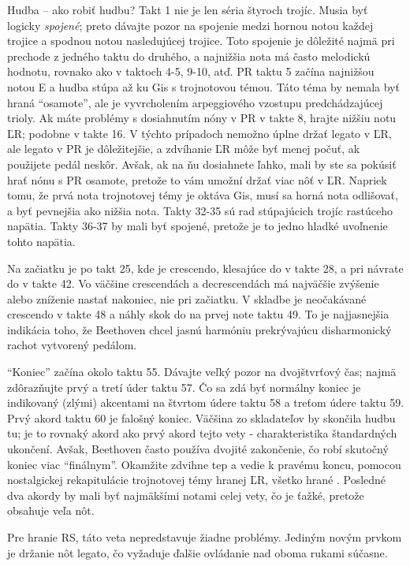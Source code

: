 Hudba – ako robiť hudbu? Takt 1 nie je len séria štyroch trojíc. Musia byť logicky \textit{spojené}; preto dávajte pozor na spojenie medzi hornou notou každej trojice a spodnou notou nasledujúcej trojice. Toto spojenie je dôležité najmä pri prechode z jedného taktu do druhého, a najnižšia nota má často melodickú hodnotu, rovnako ako v taktoch 4-5, 9-10, atď. PR taktu 5 začína najnižšou notou E a hudba stúpa až ku Gis s trojnotovou témou. Táto téma by nemala byť hraná “osamote”, ale je vyvrcholením arpeggiového vzostupu predchádzajúcej trioly. Ak máte problémy s dosiahnutím nóny v PR v takte 8, hrajte nižšiu notu ĽR; podobne v takte 16. V týchto prípadoch nemožno úplne držať legato v ĽR, ale legato v PR je dôležitejšie, a zdvíhanie ĽR môže byť menej počuť, ak použijete pedál neskôr. Avšak, ak na ňu dosiahnete ľahko, mali by ste sa pokúsiť hrať nónu s PR osamote, pretože to vám umožní držať viac nôť v ĽR. Napriek tomu, že prvá nota trojnotovej témy je oktáva Gis, musí sa horná nota odlišovať, a byť pevnejšia ako nižšia nota. Takty 32-35 sú rad stúpajúcich trojíc rastúceho napätia. Takty 36-37 by mali byť spojené, pretože je to jedno hladké uvoľnenie tohto napätia.

Na začiatku je  po takt 25, kde je crescendo, klesajúce do  v takte 28, a pri návrate do  v takte 42. Vo väčšine crescendách a decrescendách má najväčšie zvýšenie alebo zníženie nastať nakoniec, nie pri začiatku. V skladbe je neočakávané crescendo v takte 48 a náhly skok do  na prvej note taktu 49. To je najjasnejšia indikácia toho, že Beethoven chcel jasnú harmóniu prekrývajúcu disharmonický rachot vytvorený pedálom.

“Koniec” začína okolo taktu 55. Dávajte veľký pozor na dvojštvrťový čas; najmä zdôrazňujte prvý a tretí úder taktu 57. Čo sa zdá byť normálny koniec je indikovaný (zlými) akcentami na štvrtom údere taktu 58 a treťom údere taktu 59. Prvý akord taktu 60 je falošný koniec. Väčšina zo skladateľov by skončila hudbu tu; je to rovnaký akord ako prvý akord tejto vety - charakteristika štandardných ukončení. Avšak, Beethoven často používa dvojité zakončenie, čo robí skutočný koniec viac “finálnym”. Okamžite zdvihne tep a vedie k pravému koncu, pomocou nostalgickej rekapitulácie trojnotovej témy hranej ĽR, všetko hrané . Posledné dva akordy by mali byť najmäkšími notami celej vety, čo je ťažké, pretože obsahuje veľa nôt.

Pre hranie RS, táto veta nepredstavuje žiadne problémy. Jediným novým prvkom je držanie nôt legato, čo vyžaduje ďalšie ovládanie nad oboma rukami súčasne.

